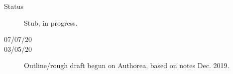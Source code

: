 \begin{description}
\item [{Status}] Stub, in progress.
\item [{07/07/20}]
\item [{03/05/20}] Outline/rough draft begun on Authorea, based on notes Dec. 2019.
\end{description}